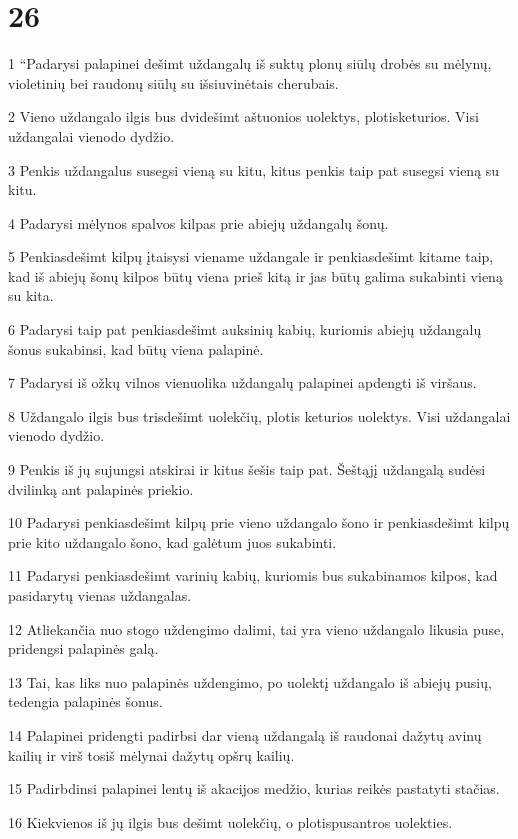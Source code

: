 \chapter{26}


\par 1 “Padarysi palapinei dešimt uždangalų iš suktų plonų siūlų drobės su mėlynų, violetinių bei raudonų siūlų su išsiuvinėtais cherubais. 
\par 2 Vieno uždangalo ilgis bus dvidešimt aštuonios uolektys, plotis­keturios. Visi uždangalai vienodo dydžio. 
\par 3 Penkis uždangalus susegsi vieną su kitu, kitus penkis taip pat susegsi vieną su kitu. 
\par 4 Padarysi mėlynos spalvos kilpas prie abiejų uždangalų šonų. 
\par 5 Penkiasdešimt kilpų įtaisysi viename uždangale ir penkiasdešimt kitame taip, kad iš abiejų šonų kilpos būtų viena prieš kitą ir jas būtų galima sukabinti vieną su kita. 
\par 6 Padarysi taip pat penkiasdešimt auksinių kabių, kuriomis abiejų uždangalų šonus sukabinsi, kad būtų viena palapinė. 
\par 7 Padarysi iš ožkų vilnos vienuolika uždangalų palapinei apdengti iš viršaus. 
\par 8 Uždangalo ilgis bus trisdešimt uolekčių, plotis keturios uolektys. Visi uždangalai vienodo dydžio. 
\par 9 Penkis iš jų sujungsi atskirai ir kitus šešis taip pat. Šeštąjį uždangalą sudėsi dvilinką ant palapinės priekio. 
\par 10 Padarysi penkiasdešimt kilpų prie vieno uždangalo šono ir penkiasdešimt kilpų prie kito uždangalo šono, kad galėtum juos sukabinti. 
\par 11 Padarysi penkiasdešimt varinių kabių, kuriomis bus sukabinamos kilpos, kad pasidarytų vienas uždangalas. 
\par 12 Atliekančia nuo stogo uždengimo dalimi, tai yra vieno uždangalo likusia puse, pridengsi palapinės galą. 
\par 13 Tai, kas liks nuo palapinės uždengimo, po uolektį uždangalo iš abiejų pusių, tedengia palapinės šonus. 
\par 14 Palapinei pridengti padirbsi dar vieną uždangalą iš raudonai dažytų avinų kailių ir virš tos­iš mėlynai dažytų opšrų kailių. 
\par 15 Padirbdinsi palapinei lentų iš akacijos medžio, kurias reikės pastatyti stačias. 
\par 16 Kiekvienos iš jų ilgis bus dešimt uolekčių, o plotis­pusantros uolekties. 
